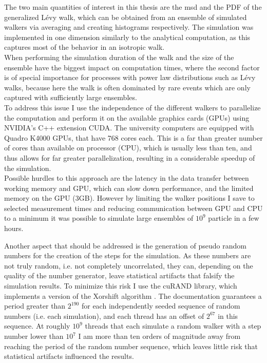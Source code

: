 The two main quantities of interest in this thesis are the \gls{msd} and the \gls{PDF} of the generalized L\'evy walk, which can be obtained from an ensemble of simulated walkers via averaging and creating histograms respectively. The simulation was implemented in one dimension similarly to the analytical computation, as this captures most of the behavior in an isotropic walk. \\
When performing the simulation duration of the walk and the size of the ensemble have the biggest impact on computation times, where the second factor is of special importance for processes with power law distributions such as L\'evy walks, because here the walk is often dominated by rare events which are only captured with sufficiently large ensembles. \\
To address this issue I use the independence of the different walkers to parallelize the computation and perform it on the available graphics cards (GPUs) using NVIDIA's C++ extension CUDA. The university computers are equipped with Quadro K4000 GPUs, that have 768 cores each. This is a far than greater number of cores than available on processor (CPU), which is usually less than ten, and thus allows for far greater parallelization, resulting in a considerable speedup of the simulation.  \\
Possible hurdles to this approach are the latency in the data transfer between working memory and GPU, which can slow down performance, and the limited memory on the GPU (3GB). However by limiting the walker positions I save to selected measurement times and reducing communication between GPU and CPU to a minimum it was possible to simulate large ensembles of $10^9$ particle in a few hours. 

Another aspect that should be addressed is the generation of pseudo random numbers for the creation of the steps for the simulation. As these numbers are not truly random, i.e. not completely uncorrelated, they can, depending on the quality of the number generator, leave statistical artifacts that falsify the simulation results. To minimize this risk I use the cuRAND library, which implements a version of the Xorshift algorithm \cite{marsaglia2003xorshift}. The documentation guarantees a period greater than $2^{190}$ for each independently seeded sequence of random numbers (i.e. each simulation), and each thread has an offset of $2^{67}$ in this sequence. At roughly $10^{9}$ threads that each simulate a random walker with a step number lower than $10^{7}$ I am more than ten orders of magnitude away from reaching the period of the random number sequence, which leaves little risk that statistical artifacts influenced the results.
